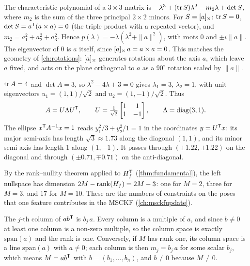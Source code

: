 \begin{solutions}
  \item The characteristic polynomial of a $3\times3$ matrix is $-\lambda^3 + (\operatorname{tr} S)\lambda^2 - m_2\lambda + \det S$, where $m_2$ is the sum of
        the three principal $2\times2$ minors. For $S = [a]_{\times}$: $\operatorname{tr} S = 0$, $\det S = a^{\mathsf{T}}(a \times a) = 0$ (the triple product with a
        repeated vector), and $m_2 = a_1^2 + a_2^2 + a_3^2$. Hence $p(\lambda) = -\lambda(\lambda^2 + \|a\|^2)$, with roots $0$ and $\pm i\|a\|$.
        The eigenvector of $0$ is $a$ itself, since $[a]_{\times}\,a = a \times a = 0$. This matches the geometry of \cref{ch:rotations}:
        $[a]_{\times}$ generates rotations about the axis $a$, which leave $a$ fixed, and acts on the plane orthogonal to $a$ as a
        $90^\circ$ rotation scaled by $\|a\|$.

  \item $\operatorname{tr} A = 4$ and $\det A = 3$, so $\lambda^2 - 4\lambda + 3 = 0$ gives $\lambda_1 = 3$, $\lambda_2 = 1$, with unit eigenvectors
        $u_1 = (1, 1)/\sqrt2$ and $u_2 = (1, -1)/\sqrt2$. Thus
        \[
          A = U\Lambda U^{\mathsf{T}}, \qquad U = \tfrac{1}{\sqrt2}\begin{bmatrix}1 & 1\\ 1 & -1\end{bmatrix}, \qquad \Lambda = \operatorname{diag}(3, 1).
        \]
        The ellipse $x^{\mathsf{T}} A^{-1} x = 1$ reads $y_1^2/3 + y_2^2/1 = 1$ in the coordinates $y = U^{\mathsf{T}} x$: its major semi-axis has length
        $\sqrt3 \approx 1.73$ along the diagonal $(1, 1)$, and its minor semi-axis has length 1 along $(1, -1)$. It passes through
        $(\pm1.22, \pm1.22)$ on the diagonal and through $(\pm0.71, \mp0.71)$ on the anti-diagonal.

  \item By the rank--nullity theorem applied to $H_f^{\mathsf{T}}$ (\cref{thm:fundamental}), the left nullspace has dimension
        $2M - \operatorname{rank}(H_f) = 2M - 3$: one for $M = 2$, three for $M = 3$, and 17 for $M = 10$. These are the numbers of
        constraints on the poses that one feature contributes in the MSCKF (\cref{ch:msckfupdate}).

  \item The $j$-th column of $ab^{\mathsf{T}}$ is $b_j\,a$. Every column is a multiple of $a$, and since $b \ne 0$ at least one column is a
        non-zero multiple, so the column space is exactly $\mathrm{span}(a)$ and the rank is one. Conversely, if $M$ has rank one,
        its column space is a line $\mathrm{span}(a)$ with $a \ne 0$; each column is then $m_j = b_j\,a$ for some scalar $b_j$, which
        means $M = ab^{\mathsf{T}}$ with $b = (b_1, \dots, b_n)$, and $b \ne 0$ because $M \ne 0$.


\end{solutions}
